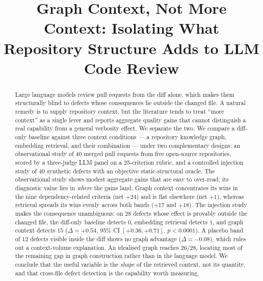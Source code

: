 \documentclass[conference]{IEEEtran}
\begin{document}
\title{Graph Context, Not More Context: Isolating What\\Repository Structure Adds to LLM Code Review}

\author{
}

\maketitle

\begin{abstract} 
Large language models review pull requests from the diff alone, which makes
them structurally blind to defects whose consequences lie outside the changed
file. A natural remedy is to supply repository context, but the literature
tends to treat ``more context'' as a single lever and reports aggregate
quality gains that cannot distinguish a real capability from a general
verbosity effect. We separate the two. We compare a diff-only baseline
against three context conditions --- a repository knowledge graph, embedding
retrieval, and their combination --- under two complementary designs: an
observational study of 40 merged pull requests from five open-source
repositories, scored by a three-judge LLM panel on a 25-criterion rubric,
and a controlled injection study of 40 synthetic defects with an objective
static-structural oracle. The observational study shows modest aggregate
gains that are easy to over-read; its diagnostic value lies in \emph{where}
the gains land. Graph context concentrates its wins in the nine
dependency-related criteria (net $+24$) and is flat elsewhere (net $+1$),
whereas retrieval spreads its wins evenly across both bands ($+17$ and
$+18$). The injection study makes the consequence unambiguous: on 28 defects
whose effect is provably outside the changed file, the diff-only baseline
detects $0$, embedding retrieval detects $1$, and graph context detects $15$
($\Delta = +0.54$, 95\% CI $[+0.36, +0.71]$, $p<0.0001$). A placebo band of
12 defects visible inside the diff shows no graph advantage
($\Delta = -0.08$), which rules out a context-volume explanation. An
idealised graph reaches $26/28$, locating most of the remaining gap in graph
construction rather than in the language model. We conclude that the useful
variable is the \emph{shape} of the retrieved context, not its quantity, and
that cross-file defect detection is the capability worth measuring.
\end{abstract}
\end{document}
